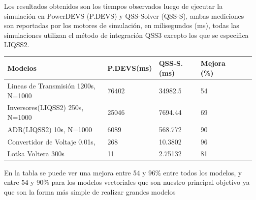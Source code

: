 	Los resultados obtenidos son los tiempos observados luego de ejecutar la simulación en PowerDEVS (P.DEVS) y QSS-Solver (QSS-S), ambas mediciones
	son reportadas por los motores de simulación, en milisegundos (ms), todas las simulaciones utilizan el método de integración QSS3 excepto los que 
	se especifica LIQSS2.

\begin{table}[H]
\centering	
\label{my-label}
\begin{tabular}{llllll}
\toprule
{\bf Modelos}            &  {\bf P.DEVS(ms)} & {\bf QSS-S. (ms)} & {\bf Mejora (\%)} \\
\toprule
Lineas de Transmisión 1200s, N=1000     & 76402         & 34982.5         & 54          \\
Inversores(LIQSS2) 250s, N=1000   	& 25046         & 7694.44         & 69        \\
ADR(LIQSS2) 10s, N=1000 		& 6089          & 568.772         & 90        \\
Convertidor de Voltaje 0.01s,        	& 268           & 10.3802         & 96         \\
Lotka  Voltera 300s      		& 11            & 2.75132         & 81

\end{tabular}
\end{table}

	En la tabla se puede ver una mejora entre 54 y 96\% entre todos los modelos, y entre 54 y 90\% para los modelos vectoriales que son nuestro principal objetivo
	ya que son la forma más simple de realizar grandes modelos
